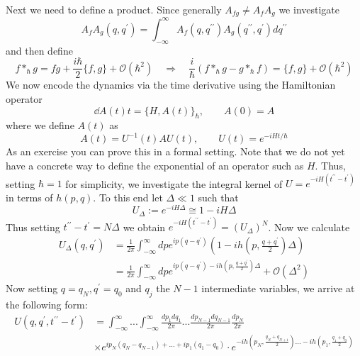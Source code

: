 \begin{example}
  Next we need to define a product. Since generally $A_{fg} \neq A_f A_g$ we investigate
  \begin{equation}A_f A_g (q, q^\prime) = \int_{-\infty}^\infty A_f(q, q^{\prime \prime}) A_g(q^{\prime \prime},q^\prime) dq^{\prime \prime}\end{equation}
  and then define
  \begin{equation}f *_\hbar g = fg + \frac{i\hbar}{2} \{f,g\} + \mathcal{O}(\hbar^2) \quad \Rightarrow \quad \frac{i}{\hbar} (f *_\hbar g - g *_\hbar f) = \{f,g\} + \mathcal{O}(\hbar^2)\end{equation}
  We now encode the dynamics via the time derivative using the Hamiltonian operator
  \begin{equation}\dd{A(t)}{t} = \{H, A(t)\}_\hbar , \quad \quad A(0) = A\end{equation}
  where we define $A(t)$ as
  \begin{equation}A(t) = U^{-1}(t) A U(t), \quad \quad U(t) = e^{-i H t / \hbar}\end{equation}
  As an exercise you can prove this in a formal setting. Note that we do not yet have a concrete way to define the exponential of an operator such as $H$. Thus, setting $\hbar = 1$ for simplicity, we investigate the integral kernel of $U = e^{-iH(t^{\prime \prime} - t^\prime)}$ in terms of $h(p,q)$. To this end let $\Delta \ll 1$ such that
  \begin{equation}U_\Delta := e^{-i H \Delta} \cong 1- i H \Delta\end{equation}
  Thus setting $t^{\prime \prime} - t^\prime = N \Delta$ we obtain $e^{-iH(t^{\prime \prime} - t^\prime)} = (U_\Delta)^N$. Now we calculate
  \begin{align}
    U_\Delta(q,q^\prime) &= \frac{1}{2\pi} \int_{-\infty}^\infty dp e^{ip(q-q^\prime)} \left( 1- i h\left(p, \frac{q+q^\prime}{2} \right) \Delta \right) \\
    &= \frac{1}{2\pi} \int_{-\infty}^\infty dp e^{ip(q-q^\prime) - i h\left(p, \frac{q+q^\prime}{2} \right) \Delta} + \mathcal{O}(\Delta^2)
  \end{align}
  Now setting $q = q_N, q^\prime = q_0$ and $q_j$ the $N-1$ intermediate variables, we arrive at the following form:
  \begin{align}
    U(q, q^\prime, t^{\prime\prime}-t^\prime) &= \int_{-\infty}^\infty ... \int_{-\infty}^\infty \frac{dp_1 dq_1}{2\pi} ... \frac{dp_{N-1} dq_{N-1}}{2\pi} \frac{dp_N}{2\pi}\\
    &\times e^{ip_{N}(q_{N}-q_{N-1}) + ... + ip_1(q_1-q_0)} \cdot e^{-ih\left(p_N, \frac{q_N + q_{N+1}}{2}\right) ... -ih\left( p_1, \frac{q_1 + q_0}{2} \right)}
  \end{align}


\end{example}
